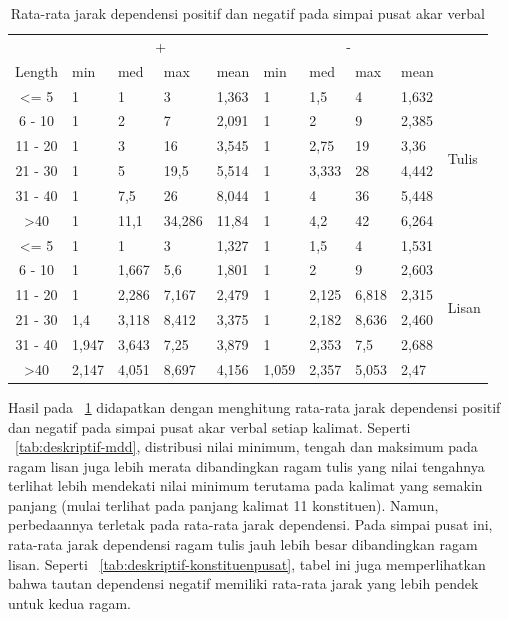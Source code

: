 \documentclass[10pt, a4paper, conference, compsocconf]{IEEEtran}
\begin{document}
\begin{table}
\begin{center}
\begin{footnotesize}
\caption{Rata-rata jarak dependensi positif dan negatif pada simpai pusat akar verbal}  \label{tab:deskriptif-mddpusat}
\begin{tabular}{c l l l l l l l l l}
\hline
 & \multicolumn{4}{c}{+} & \multicolumn{4}{c}{-} & \\  \cline{2-9}  
Length & min 	& med	& max 	& mean 	& min 	& med 	& max 	& mean 	& \\ \cline{1-10}  
\textless= 5 	& 1 		& 1 		& 3	 	& 1,363	& 1 		& 1,5		& 4	 	& 1,632	&\multirow{6}{*}{Tulis}\\
6 - 10 		& 1 		& 2		& 7	 	& 2,091	& 1 		& 2	 	& 9	 	& 2,385	& 	\\
11 - 20 		& 1 		& 3	 	& 16	 	& 3,545	& 1 		& 2,75 	& 19	 	& 3,36 	& 	\\
21 - 30 		& 1 		& 5	 	& 19,5 	& 5,514	& 1 		& 3,333	& 28		& 4,442	& 	\\ 
31 - 40 		& 1	 	& 7,5	 	& 26		& 8,044	& 1 		& 4		& 36		& 5,448	& 	\\
\textgreater 40 	& 1	 	& 11,1	& 34,286	& 11,84	& 1 		& 4,2		& 42		& 6,264	& 	\\ 
\hline
\textless= 5 	& 1 		& 1 		& 3		& 1,327	& 1 		& 1,5 	& 4		& 1,531	& \multirow{6}{*}{Lisan}\\
6 - 10 		& 1 		& 1,667	& 5,6		& 1,801	& 1 		& 2		& 9		& 2,603	& \\
11 - 20 		& 1 		& 2,286	& 7,167	& 2,479	& 1 		& 2,125	& 6,818	& 2,315	& \\
21 - 30 		& 1,4	 	& 3,118	& 8,412	& 3,375	& 1 		& 2,182	& 8,636	& 2,460	& \\ 
31 - 40 		& 1,947	& 3,643	& 7,25	& 3,879	& 1 		& 2,353	& 7,5		& 2,688	& \\
\textgreater 40 	& 2,147	 & 4,051	& 8,697	& 4,156	& 1,059	& 2,357	& 5,053	& 2,47	& \\ 
\hline
   \end{tabular}
   \end{footnotesize}
\end{center}
\end{table}

Hasil pada \tab~\ref{tab:deskriptif-mddpusat} didapatkan dengan menghitung rata-rata jarak dependensi positif dan negatif pada simpai pusat akar verbal setiap kalimat. Seperti \tab~\ref{tab:deskriptif-mdd}, distribusi nilai minimum, tengah dan maksimum pada ragam lisan juga lebih merata dibandingkan ragam tulis yang nilai tengahnya terlihat lebih mendekati nilai minimum terutama pada kalimat yang semakin panjang (mulai terlihat pada panjang kalimat 11 konstituen). Namun, perbedaannya terletak pada rata-rata jarak dependensi. Pada simpai pusat ini, rata-rata jarak dependensi ragam tulis jauh lebih besar dibandingkan ragam lisan. Seperti \tab~\ref{tab:deskriptif-konstituenpusat}, tabel ini juga memperlihatkan bahwa tautan dependensi negatif memiliki rata-rata jarak yang lebih pendek untuk kedua ragam. 
\end{document}
